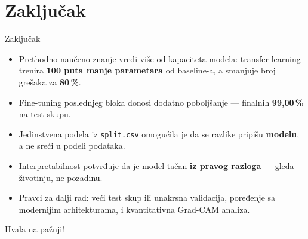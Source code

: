 \documentclass[8pt,a4paper]{beamer}
\begin{document}
\section{Zaključak}

\begin{frame}{Zaključak}
\begin{itemize}
    \item Prethodno naučeno znanje vredi više od kapaciteta modela: transfer learning trenira \textbf{100 puta manje parametara} od baseline-a, a smanjuje broj grešaka za \textbf{80\,\%}. \pause
    \item Fine-tuning poslednjeg bloka donosi dodatno poboljšanje --- finalnih \textbf{99,00\,\%} na test skupu. \pause
    \item Jedinstvena podela iz \texttt{split.csv} omogućila je da se razlike pripišu \textbf{modelu}, a ne sreći u podeli podataka. \pause
    \item Interpretabilnost potvrđuje da je model tačan \textbf{iz pravog razloga} --- gleda životinju, ne pozadinu. \pause
    \item Pravci za dalji rad: veći test skup ili unakrsna validacija, poređenje sa modernijim arhitekturama, i kvantitativna Grad-CAM analiza.
\end{itemize}
\end{frame}

\begin{frame}
    \vfill
    \centering
    \Huge Hvala na pažnji!
    \vfill
\end{frame}
\end{document}
